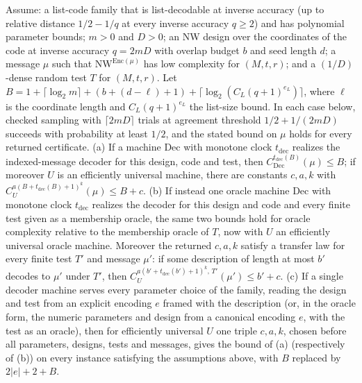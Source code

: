 \begin{theorem}
  \label{thm:avg-nw-kolmogorov}
  \leanok
  Assume: a list-code family that is list-decodable at inverse accuracy (up to
  relative distance $1/2 - 1/q$ at every inverse accuracy $q \ge 2$) and has
  polynomial parameter bounds; $m > 0$ and $D > 0$; an NW design over the
  coordinates of the code at inverse accuracy $q = 2mD$ with overlap budget $b$
  and seed length $d$; a message $\mu$ such that $\mathrm{NW}^{\mathrm{Enc}(\mu)}$
  has low complexity for $(M, t, r)$; and a $(1/D)$-dense random test $T$ for
  $(M, t, r)$. Let $B = 1 + \lceil\log_2 m\rceil + (b + (d - \ell) + 1) +
  \lceil \log_2 (C_L (q+1)^{e_L}) \rceil$, where $\ell$ is the coordinate length
  and $C_L (q+1)^{e_L}$ the list-size bound. In each case below, checked
  sampling with $\lceil 2mD \rceil$ trials at agreement threshold
  $1/2 + 1/(2mD)$ succeeds with probability at least $1/2$, and the stated
  bound on $\mu$ holds for every returned certificate.
  (a) If a machine $\mathrm{Dec}$ with monotone clock $t_{\mathrm{dec}}$
  realizes the indexed-message decoder for this design, code and test, then
  $C^{t_{\mathrm{dec}}(B)}_{\mathrm{Dec}}(\mu) \le B$; if moreover $U$ is an
  efficiently universal machine, there are constants $c, a, k$ with
  $C^{a(B + t_{\mathrm{dec}}(B) + 1)^k}_U(\mu) \le B + c$.
  (b) If instead one oracle machine $\mathrm{Dec}$ with monotone clock
  $t_{\mathrm{dec}}$ realizes the decoder for this design and code and every
  finite test given as a membership oracle, the same two bounds hold for
  oracle complexity relative to the membership oracle of $T$, now with $U$ an
  efficiently universal oracle machine. Moreover the returned $c, a, k$ satisfy
  a transfer law for every finite test $T'$ and message $\mu'$: if some
  description of length at most $b'$ decodes to $\mu'$ under $T'$, then
  $C^{a(b' + t_{\mathrm{dec}}(b') + 1)^k,\, T'}_U(\mu') \le b' + c$.
  (c) If a single decoder machine serves every parameter choice of the family,
  reading the design and test from an explicit encoding $e$ framed with the
  description (or, in the oracle form, the numeric parameters and design from
  a canonical encoding $e$, with the test as an oracle), then for efficiently
  universal $U$ one triple $c, a, k$, chosen before all parameters, designs,
  tests and messages, gives the bound of (a) (respectively of (b)) on every
  instance satisfying the assumptions above, with $B$ replaced by
  $2|e| + 2 + B$.
\end{theorem}
